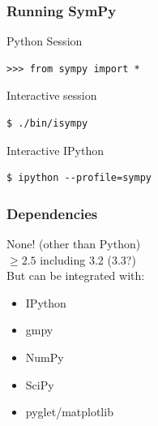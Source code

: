 \documentclass{beamer}
\begin{document}
\begin{frame}[fragile]
  \frametitle{Running SymPy}
  Python Session
  \begin{exampleblock}{}
    \begin{verbatim}>>> from sympy import *\end{verbatim}
  \end{exampleblock}
  Interactive session
  \begin{exampleblock}{}
    \begin{verbatim}$ ./bin/isympy\end{verbatim}
  \end{exampleblock}
  Interactive IPython
  \begin{exampleblock}{}
    \begin{verbatim}$ ipython --profile=sympy\end{verbatim}
  \end{exampleblock}
\end{frame}

\begin{frame}
  \frametitle{Dependencies}
  None! (other than Python) \\
  $\geq2.5$ including 3.2 (3.3?)\\[.3in]

  But can be integrated with:
  \begin{itemize}
    \item IPython
    \item gmpy
    \item NumPy
    \item SciPy
    \item pyglet/matplotlib
  \end{itemize}
\end{frame}
\end{document}
